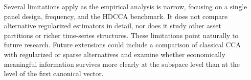 \documentclass[12pt]{report} %
\newcommand{\setresultnumbering}[1]{%
    \renewcommand{\thefigure}{#1.\arabic{figure}}%
    \renewcommand{\thetable}{#1.\arabic{table}}%
}
\newcommand{\resetresultnumbering}[1]{%
    \setcounter{figure}{0}%
    \setcounter{table}{0}%
    \setresultnumbering{#1}%
}
\begin{document}
Several limitations apply as the empirical analysis is narrow, focusing on a single panel design, 
frequency, and the HDCCA benchmark. It does not compare alternative
regularized estimators in detail, nor does it study other asset partitions or richer time-series
structures. These limitations point naturally to future research. Future extensions could include
a comparison of classical CCA with regularized or sparse alternatives and examine whether economically
meaningful information survives more clearly at the subspace level than at the level of the first
canonical vector.


\nocite{*}
\begingroup
\singlespacing
\setlength{\bibitemsep}{0.25\baselineskip}
\setlength{\bibparsep}{0pt}
\printbibliography
\endgroup

\clearpage

\resetresultnumbering{3}
\end{document}

